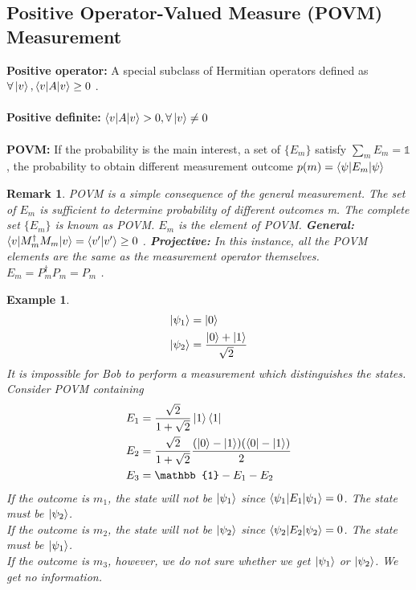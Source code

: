 \documentclass[]{book}
\newtheorem*{remark}{Remark}
\newtheorem*{example}{Example}
\theoremstyle{nonumberplain}
\begin{document}
\subsection{Positive Operator-Valued Measure (POVM) Measurement}
\textbf{Positive operator:} A special subclass of Hermitian operators defined as $\forall \ket{v}, \braket{v|A|v} \geq 0$ .\\
\\
\textbf{Positive definite:}  $\braket{v|A|v}>0 , \forall \ket{v}\neq 0$\\
\\
\textbf{POVM:} If the probability is the main interest, a set of $\{E_{m}\}$ satisfy $\sum^{}_{m} E_{m}=\mathbb{1}$ , the probability to obtain different measurement outcome $p(m)=\braket{\psi|E_{m}|\psi}$
\begin{remark}
	POVM is a simple consequence of the general measurement. The set of $E_{m}$ is sufficient to determine probability of different outcomes m. The complete set $\{E_{m}\}$ is known as POVM. $E_{m}$ is the element of POVM. 
        \textbf{General: } $\braket{v|M^{\dagger}_{m}M_{m}|v}=\braket{v'|v'}\geq 0$ .
        \textbf{Projective: }In this instance, all the POVM elements are the same as the measurement operator themselves. $E_{m}=P^{\dagger}_{m}P_{m}=P_{m}$ .
\end{remark}
\begin{example}
\begin{equation*}
\begin{aligned}
	\ket{{\psi_{1}}}&=\ket{0}\\
	\ket{\psi_{2}}&=\frac{\ket{0}+\ket{1}}{\sqrt{2}}
\end{aligned}
\end{equation*}
It is impossible for Bob to perform a measurement which distinguishes the states. \\
Consider POVM containing 
\begin{equation*}
\begin{aligned}
	E_{1}&=\frac{\sqrt{2}}{1+\sqrt{2}}\ket{1}\bra{1}\\
	E_{2}&=\frac{\sqrt{2}}{1+\sqrt{2}}\frac{(\ket{0}-\ket{1})(\bra{0}-\ket{1})}{2}\\
	E_{3}&=\mathbb{1}-E_{1}-E_{2}
\end{aligned}
\end{equation*}
If the outcome is $m_{1}$, the state will not be $\ket{\psi_{1}}$ since $\braket{\psi_{1}|E_{1}|\psi_{1}}=0$. The state must be $\ket{\psi_{2}}$.\\
If the outcome is $m_{2}$, the state will not be $\ket{\psi_{2}}$ since $\braket{\psi_{2}|E_{2}|\psi_{2}}=0$. The state must be $\ket{\psi_{1}}$.\\
If the outcome is $m_{3}$, however, we do not sure whether we get $\ket{\psi_{1}}$ or $\ket{\psi_{2}}$. We get no information.
\end{example}
\end{document}
